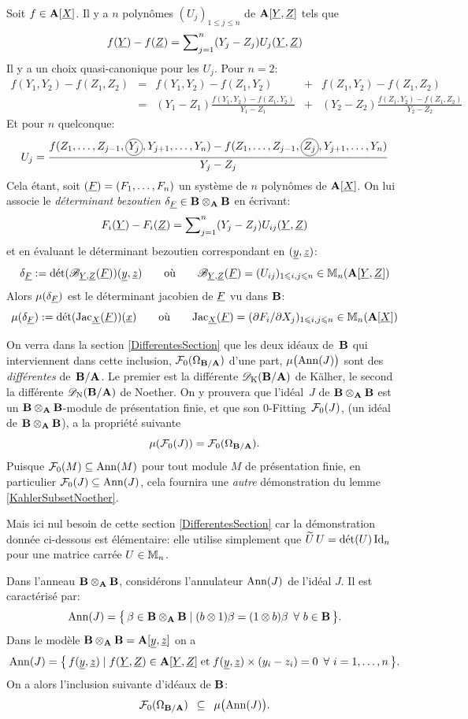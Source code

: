 \documentclass[12pt,twoside,a4paper]{article}
\begin{document}
Soit $f \in \mathbf{A}[{\underline{X}}]$. Il y a $n$ polynômes $(U_{j})_{1 \le j \le n}$ de $\mathbf{A}[{\underline{Y}},{\underline{Z}}]$ tels que
$$
f({\underline{Y}}) - f({\underline{Z}}) = \sum\nolimits_{j=1}^n (Y_j-Z_j) U_j({\underline{Y}},{\underline{Z}})
$$
Il y a un choix quasi-canonique pour les $U_j$. Pour $n=2$:
$$
\begin {array}{ccccc}
f(Y_1,Y_2) - f(Z_1,Z_2) &=& f(Y_1,Y_2) - f(Z_1,Y_2) &+& f(Z_1,Y_2) - f(Z_1,Z_2)
\\[2mm]
&=& (Y_1-Z_1) \frac{f(Y_1,Y_2) - f(Z_1,Y_2)}{Y_1-Z_1} &+&
(Y_2 - Z_2) \frac{f(Z_1,Y_2) - f(Z_1,Z_2)}{Y_2-Z_2}
\end {array}
$$
Et pour $n$ quelconque:
$$
U_j =
\dfrac{f(Z_1,\dots, Z_{j-1}, \cercle{$Y_j$}, Y_{j+1},\dots,Y_n) -
f(Z_1,\dots,Z_{j-1},\cercle{$Z_j$},Y_{j+1},\dots,Y_n)}
{Y_j - Z_j}
$$
Cela étant, soit $({\underline{F}}) = (F_1, \dots, F_n)$ un système de $n$ polynômes de $\mathbf{A}[{\underline{X}}]$.
On lui associe le \textsl{déterminant bezoutien} $\delta_{\underline{F}} \in \mathbf{B}\otimes_{\mathbf{A}}\mathbf{B}$ 
en écrivant:
$$
F_i({\underline{Y}}) - F_i({\underline{Z}}) = \sum\nolimits_{j=1}^n (Y_j-Z_j) U_{ij}({\underline{Y}},{\underline{Z}})
$$
et en évaluant le déterminant bezoutien correspondant en $({\underline{y}},{\underline{z}})$:
$$
\delta_{\underline{F}} := \mathop{\mathrm{d\acute{e}t}}\nolimits (\mathscr{B}_{{\underline{Y}},{\underline{Z}}}({\underline{F}}))({\underline{y}},{\underline{z}})
\qquad \text{où} \qquad
\mathscr{B}_{{\underline{Y}},{\underline{Z}}}({\underline{F}}) = (U_{ij})_{1\leqslant i,j \leqslant n} \in \mathbb {M}_n(\mathbf{A}[{\underline{Y}},{\underline{Z}}])
$$
Alors $\mu(\delta_{\underline{F}})$ est le déterminant jacobien de ${\underline{F}}$ vu dans $\mathbf{B}$:
$$
\mu(\delta_{\underline{F}}) := \mathop{\mathrm{d\acute{e}t}}\nolimits (\mathrm{Jac}_{\underline{X}}({\underline{F}}))({\underline{x}})
\qquad \text{où} \qquad
\mathrm{Jac}_{\underline{X}}({\underline{F}}) = (\partial F_i/\partial X_j)_{1\leqslant i,j \leqslant n} \in \mathbb {M}_n(\mathbf{A}[{\underline{X}}])
$$

On verra dans la section \ref{DifferentesSection} que les deux
idéaux de~$\mathbf{B}$ qui interviennent dans cette inclusion,
${\cal F}_0(\Omega_{\mathbf{B}/\mathbf{A}})$ d'une part, $\mu\big(\mathrm{Ann}(J)\big)$ sont
des \textsl{différentes} de~$\mathbf{B}/\mathbf{A}$. Le premier est la différente
$\mathscr{D}_{\rm K}(\mathbf{B}/\mathbf{A})$ de Kälher, le second la différente $\mathscr{D}_{\rm N}(\mathbf{B}/\mathbf{A})$
de Noether. On y prouvera que l'idéal~$J$ de $\mathbf{B}\otimes_{\mathbf{A}}\mathbf{B}$ est un
$\mathbf{B}\otimes_{\mathbf{A}}\mathbf{B}$-module de présentation finie, et que son
$0$-Fitting~${\cal F}_0(J)$, (un idéal de $\mathbf{B}\otimes_{\mathbf{A}}\mathbf{B}$), a la propriété suivante
$$
\mu({\cal F}_0(J)) = {\cal F}_0(\Omega_{\mathbf{B}/\mathbf{A}}).
$$
Puisque ${\cal F}_0(M) \subseteq \mathrm{Ann}(M)$ pour tout module $M$ de
présentation finie, en particulier ${\cal F}_0(J) \subseteq \mathrm{Ann}(J)$, cela
fournira une \textsl{autre} démonstration du lemme \ref{KahlerSubsetNoether}.

\smallskip Mais ici nul besoin de cette section \ref{DifferentesSection} car la
démonstration donnée ci-dessous est élémentaire: elle utilise simplement que
$\widetilde U\, U = \mathop{\mathrm{d\acute{e}t}}\nolimits(U)\mathop{\mathrm{Id}}\nolimits_n$ pour une matrice carrée
\hbox{$U \in \mathbb {M}_n$}.


\begin {lemma}
\label{KahlerSubsetNoether}

Dans l'anneau $\mathbf{B}\otimes_{\mathbf{A}}\mathbf{B}$, considérons  l'annulateur $\mathrm{Ann}(J)$ de l'idéal $J$.
Il est caractérisé par:
$$
\mathrm{Ann}(J) = \big\{\,\beta \in \mathbf{B}\otimes_{\mathbf{A}}\mathbf{B} \mid
(b\otimes 1)\beta = (1\otimes b)\beta \enspace \forall\ b \in \mathbf{B} \,\big\}.
$$
Dans le modèle $\mathbf{B}\otimes_{\mathbf{A}}\mathbf{B} = \mathbf{A}[{\underline{y}},{\underline{z}}]$ on a 
$$
\mathrm{Ann}(J) = \big\{\,f({\underline{y}},{\underline{z}})  \mid f({\underline{Y}},{\underline{Z}}) \in \mathbf{A}[{\underline{Y}},{\underline{Z}}] \;\mathrm{ et }\;
f({\underline{y}},{\underline{z}})\times (y_i-z_i) = 0 \enspace \forall\ i=1, \dots, n\,\big\}.
$$
On a alors l'inclusion suivante d'idéaux de $\mathbf{B}$:
$$
{\cal F}_0(\Omega_{\mathbf{B}/\mathbf{A}}) \enspace\subseteq\enspace \mu\big(\mathrm{Ann}(J)\big).
$$
\end {lemma}
\end{document}
